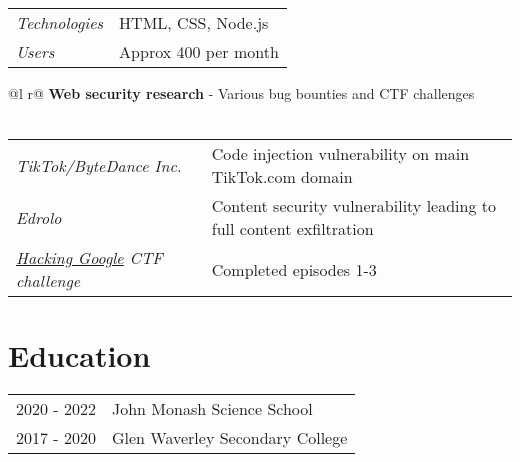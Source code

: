 \documentclass[a4paper,12pt]{article}
\begin{document}
\begin{tabularx}{\linewidth}{l X}
    \textit{Technologies} & \hfill HTML, CSS, Node.js \\
    \textit{Users} & \hfill Approx 400 per month \\
\end{tabularx}

\begin{tabularx}{\linewidth}{ @{}l r@{} }
\textbf{Web security research} - Various bug bounties and CTF challenges \\[3.75pt]
  \\
\end{tabularx}

\begin{tabularx}{\linewidth}{l X}
    \textit{TikTok/ByteDance Inc.} & \hfill Code injection vulnerability on main TikTok.com domain \\
    \textit{Edrolo} & \hfill Content security vulnerability leading to full content exfiltration \\
    \textit{\href{https://h4ck1ng.google/}{Hacking Google} CTF challenge} & \hfill Completed episodes 1-3 \\
\end{tabularx}

\section{Education}
\begin{tabularx}{\linewidth}{@{}l X@{}}	

2020 - 2022 & John Monash Science School \hfill \normalsize \\
2017 - 2020 & Glen Waverley Secondary College \hfill \\ 

\end{tabularx}

\end{document}
